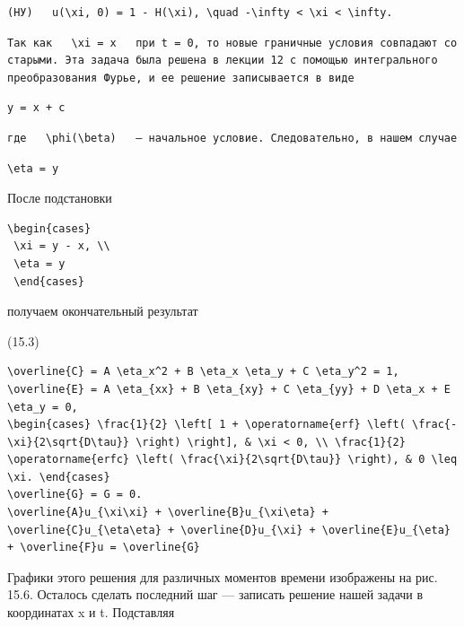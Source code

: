 \documentclass[
  ukrainian,
]{article}
\begin{document}
\begin{verbatim}
(НУ)   u(\xi, 0) = 1 - H(\xi), \quad -\infty < \xi < \infty.
\end{verbatim}

\begin{verbatim}
Так как   \xi = x   при t = 0, то новые граничные условия совпадают со старыми. Эта задача была решена в лекции 12 с помощью интегрального преобразования Фурье, и ее решение записывается в виде
\end{verbatim}

\begin{verbatim}
y = x + c
\end{verbatim}

\begin{verbatim}
где   \phi(\beta)   — начальное условие. Следовательно, в нашем случае
\end{verbatim}

\begin{verbatim}
\eta = y
\end{verbatim}

После подстановки

\begin{verbatim}
\begin{cases}
 \xi = y - x, \\
 \eta = y
 \end{cases}
\end{verbatim}

получаем окончательный результат

(15.3)

\begin{verbatim}
\overline{C} = A \eta_x^2 + B \eta_x \eta_y + C \eta_y^2 = 1,
\overline{E} = A \eta_{xx} + B \eta_{xy} + C \eta_{yy} + D \eta_x + E \eta_y = 0,
\begin{cases} \frac{1}{2} \left[ 1 + \operatorname{erf} \left( \frac{-\xi}{2\sqrt{D\tau}} \right) \right], & \xi < 0, \\ \frac{1}{2} \operatorname{erfc} \left( \frac{\xi}{2\sqrt{D\tau}} \right), & 0 \leq \xi. \end{cases}
\overline{G} = G = 0.
\overline{A}u_{\xi\xi} + \overline{B}u_{\xi\eta} + \overline{C}u_{\eta\eta} + \overline{D}u_{\xi} + \overline{E}u_{\eta} + \overline{F}u = \overline{G}
\end{verbatim}

Графики этого решения для различных моментов времени изображены на рис.
15.6. Осталось сделать последний шаг --- записать решение нашей задачи в
координатах x и t. Подставляя
\end{document}
